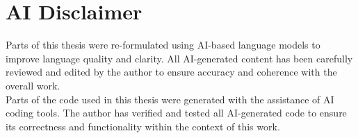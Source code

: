 \newpage
\thispagestyle{empty}
\section*{AI Disclaimer}
\thispagestyle{empty}
Parts of this thesis were re-formulated using AI-based language models to improve language quality and clarity. All AI-generated content has been carefully reviewed and edited by the author to ensure accuracy and coherence with the overall work.
\vspace{\baselineskip}\\
Parts of the code used in this thesis were generated with the assistance of AI coding tools. The author has verified and tested all AI-generated code to ensure its correctness and functionality within the context of this work.
